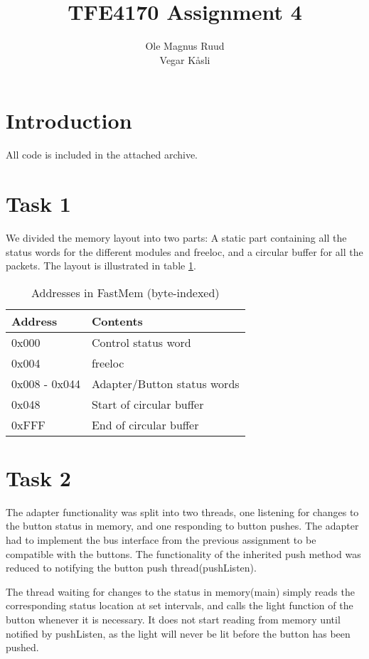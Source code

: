 \documentclass[11pt]{report}
\title{TFE4170 Assignment 4}
\author{Ole Magnus Ruud \\ Vegar K\aa sli}
\begin{document}
\maketitle
\clearpage

\section*{Introduction}

All code is included in the attached archive. 

\section*{Task 1}

We divided the memory layout into two parts: A static part containing all the
status words for the different modules and freeloc, and a circular buffer for
all the packets. The layout is illustrated in table \ref{table}. 


\begin{table}[htbp]
  \centering
  \begin{tabular}{|l|l|}
    \hline
    Address&Contents \\
    \hline
0x000 & Control status word \\
0x004 & freeloc \\
0x008 - 0x044 & Adapter/Button status words \\ 
0x048 &Start of circular buffer\\
0xFFF &End of circular buffer\\
    \hline
  \end{tabular}
  \caption{Addresses in FastMem (byte-indexed)}
  \label{table}
\end{table}
\section*{Task 2}

The adapter functionality was split into two threads, one listening for
changes to the button status in memory, and one responding to button pushes.
The adapter had to implement the bus interface from the previous assignment
to be compatible with the buttons. The functionality of the inherited push
method was reduced to notifying the button push thread(pushListen).

The thread waiting for changes to the status in memory(main) simply reads the 
corresponding status location at set intervals, and calls the light function
of the button whenever it is necessary. It does not start reading from memory
until notified by pushListen, as the light will never be lit before the button
has been pushed.
\end{document}

